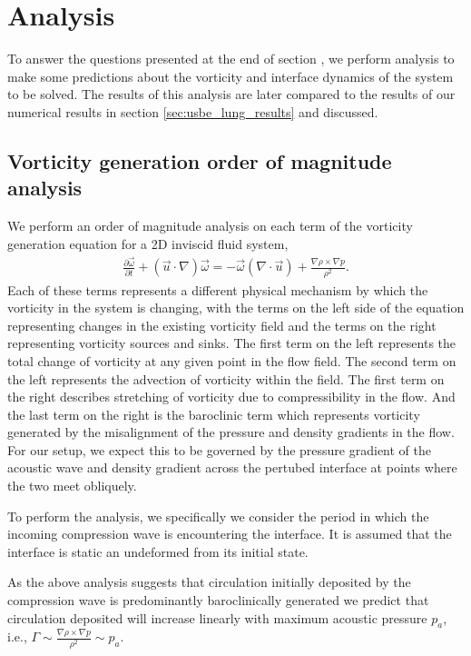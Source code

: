 \section{Analysis} \label{sec:usbe_lung_analysis} To answer the
questions presented at the end of
section \label{sec:usbe_lung_introduction}, we perform analysis to
make some predictions about the vorticity and interface dynamics of
the system to be solved. The results of this analysis are later
compared to the results of our numerical results in section
\ref{sec:usbe_lung_results} and discussed.

\subsection{Vorticity generation order of magnitude analysis}
We perform an order of magnitude analysis on each term of the
vorticity generation equation for a 2D inviscid fluid
system, 
\begin{align} \label{eq:vorticity_euler}
  \frac{\partial \vec{\omega}}{\partial t}+\left(\vec{u}\cdot\nabla\right)\vec{\omega} =%
  - \vec{\omega}\left(\nabla\cdot\vec{u}\right) + \frac{\nabla\rho\times\nabla p}{\rho^2}.%
\end{align}
Each of these terms represents a different physical mechanism by which
the vorticity in the system is changing, with the terms on the left
side of the equation representing changes in the existing vorticity
field and the terms on the right representing vorticity sources and
sinks. The first term on the left represents the total change of
vorticity at any given point in the flow field. The second term on the
left represents the advection of vorticity within the field. The first
term on the right describes stretching of vorticity due to
compressibility in the flow. And the last term on the right is the
baroclinic term which represents vorticity generated by the
misalignment of the pressure and density gradients in the flow. For
our setup, we expect this to be governed by the pressure gradient of
the acoustic wave and density gradient across the pertubed interface
at points where the two meet obliquely.

To perform the analysis, we specifically we consider the period in
which the incoming compression wave is encountering the interface. It
is assumed that the interface is static an undeformed from its
initial state.



As the above analysis suggests that circulation initially deposited by
the compression wave is predominantly baroclinically generated we
predict that circulation deposited will increase linearly with maximum
acoustic pressure $p_a$, i.e.,
$\Gamma \sim \frac{\nabla \rho\times\nabla p}{\rho^2}\sim p_a$.

